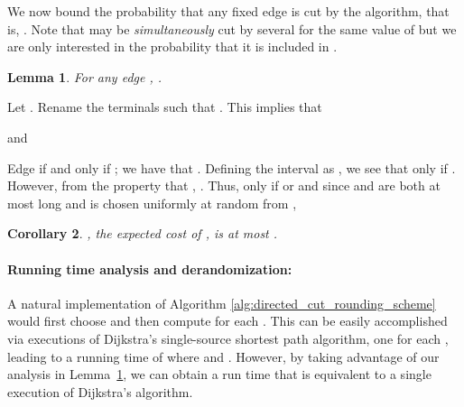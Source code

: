 \documentclass[11pt]{article}
\newtheorem{lemma}{Lemma}[section]
\newtheorem{corollary}[lemma]{Corollary}
\renewenvironment{proof}{\vspace{-0.1in}\noindent{\bf Proof:}}{\hspace*{\fill}\par}
\begin{document}
We now bound the probability that any fixed edge  is cut by the
algorithm, that is, .  Note that  may be {\em
  simultaneously} cut by several  for the same value of 
but we are only interested in the probability that it is included in
.

\begin{lemma}
  \label{lem:prob-e-cut}
  For any edge , .
\end{lemma}
\begin{proof}
  Let . Rename the terminals such that . This implies that 
  
  and 
  
  Edge  if and only if ; we have that . 
  Defining the interval  as , we see
  that  only if . 
  However, from the property that ,
  . Thus, 
   only if  or  and
  since  and  are both at most  long and 
  is chosen uniformly at random from ,
  
\end{proof}

\begin{corollary}
  , the expected cost of , is at most .
\end{corollary}




\iffalse
\begin{lemma}
Expected cost of a cut returned by algorithm \ref{alg:directed_cut_rounding_scheme} is at most twice the fractional solution cost\Big(\Big).
\end{lemma}
\begin{proof}
Fix an edge  and rename the terminals such that . This implies that . Edge  is included in  if for some ,  i.e. . Note that .

 If , then . If , then . So, an edge  is cut only if  or . 

Let  be an indicator variable denoting if  belongs to  or not. 

\end{proof}


\begin{proof}(Theorem \ref{thm:directed_cut_approximation})

\end{proof}
\fi

\paragraph{Running time analysis and derandomization:}
A natural implementation of Algorithm
\ref{alg:directed_cut_rounding_scheme} would first choose  and
then compute  for each .  This can be easily
accomplished via  executions of Dijkstra's single-source shortest
path algorithm, one for each , leading to a running time of
 where  and . However, by taking
advantage of our analysis in Lemma~\ref{lem:prob-e-cut}, we can obtain
a run time that is equivalent to a single execution of Dijkstra's
algorithm.
\end{document}
